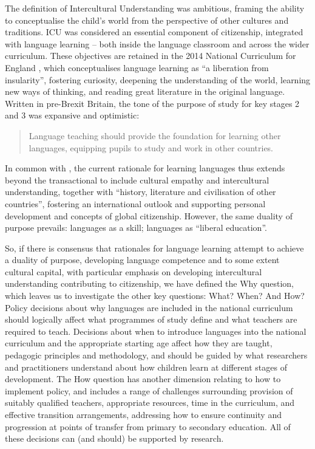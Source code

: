 \documentclass[output=paper]{langscibook}
\begin{document}
The definition of Intercultural Understanding was ambitious, framing the ability to conceptualise the child’s world from the perspective of other cultures and traditions. ICU was considered an essential component of citizenship, integrated with language learning -- both inside the language classroom and across the wider curriculum. These objectives are retained in the 2014 National Curriculum for England \citep{DfE2014}, which conceptualises language learning as ``a liberation from insularity'', fostering curiosity, deepening the understanding of the world, learning new ways of thinking, and reading great literature in the original language. Written in pre-Brexit Britain, the tone of the purpose of study for key stages 2 and 3 was expansive and optimistic:

\begin{quote}
Language teaching should provide the foundation for learning other languages, equipping pupils to study and work in other countries. \citep{DfE2014}
\end{quote}

In common with \citet{Leathes1918}, the current rationale for learning languages thus extends beyond the transactional to include cultural empathy and intercultural understanding, together with ``history, literature and civilisation of other countries'', fostering an international outlook and supporting personal development and concepts of global citizenship. However, the same duality of purpose prevails: languages as a skill; languages as ``liberal education''.  

\begin{sloppypar}
So, if there is consensus that rationales for language learning attempt to achieve a duality of purpose, developing language competence and to some extent cultural capital, with particular emphasis on developing intercultural understanding contributing to citizenship, we have defined the Why question, which leaves us to investigate the other key questions: What? When? And How? Policy decisions about why languages are included in the national curriculum should logically affect what programmes of study define and what teachers are required to teach. Decisions about when to introduce languages into the national curriculum and the appropriate starting age affect how they are taught, pedagogic principles and methodology, and should be guided by what researchers and practitioners understand about how children learn at different stages of development. The How question has another dimension relating to how to implement policy, and includes a range of challenges surrounding provision of suitably qualified teachers, appropriate resources, time in the curriculum, and effective transition arrangements, addressing how to ensure continuity and progression at points of transfer from primary to secondary education.  All of these decisions can (and should) be supported by research. 
\end{sloppypar}
\end{document}
